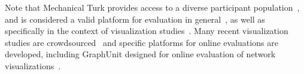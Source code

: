 Note that Mechanical Turk provides access to a diverse participant population~\cite{mason2012conducting,kosara2010mechanical}, and is considered a valid platform for evaluation in general~\cite{paolacci2010running,kosara2010mechanical}, as well as specifically in the context of visualization studies~\cite{heer2010crowdsourcing}. 
Many recent visualization studies 
are crowdsourced~\cite{chapman2014visualizing,micallef2012assessing,jianu2014display,rodgers2015visualizing,borkin2013makes} and specific platforms for online evaluations are developed, including GraphUnit designed for online evaluation of network visualizations~\cite{okoe2015graphunit}.




